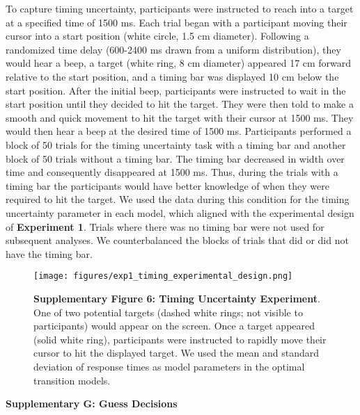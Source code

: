 \documentclass[12pt]{article}
\newcommand\boldblue[1]{\textcolor{mydarkblue}{\textbf{#1}}}
\begin{document}
\noindent To capture timing uncertainty, participants were instructed to reach into a target at a specified time of 1500 ms. Each trial began with a participant moving their cursor into a start position (white circle, 1.5 cm diameter). Following a randomized time delay (600-2400 ms drawn from a uniform distribution), they would hear a beep, a target (white ring, 8 cm diameter) appeared 17 cm forward relative to the start position, and a timing bar was displayed 10 cm below the start position. After the initial beep, participants were instructed to wait in the start position until they decided to hit the target. They were then told to make a smooth and quick movement to hit the target with their cursor at 1500 ms. They would then hear a beep at the desired time of 1500 ms. Participants performed a block of 50 trials for the timing uncertainty task with a timing bar and another block of 50 trials without a timing bar. The timing bar decreased in width over time and consequently disappeared at 1500 ms. Thus, during the trials with a timing bar the participants would have better knowledge of when they were required to hit the target. We used the data during this condition for the timing uncertainty parameter in each model, which aligned with the experimental design of \boldblue{Experiment 1}. Trials where there was no timing bar were not used for subsequent analyses. We counterbalanced the blocks of trials that did or did not have the timing bar.
\begin{figure}[H]
    \centering
    \texttt{[image: figures/exp1\_timing\_experimental\_design.png]}

    \caption*{\boldblue{Supplementary Figure 6: Timing Uncertainty Experiment}. One of two potential targets (dashed white rings; not visible to participants) would appear on the screen. Once a target appeared (solid white ring), participants were instructed to rapidly move their cursor to hit the displayed target. We used the mean and standard deviation of response times as model parameters in the optimal transition models.}
\end{figure}

\newpage
\noindent\boldblue{\large\textcolor{mydarkblue}{Supplementary G: Guess Decisions}}
\end{document}

